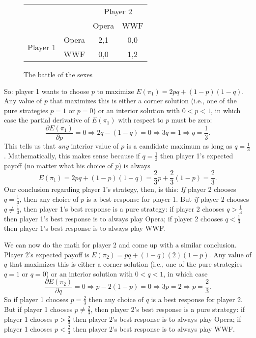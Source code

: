 \begin{figure}[b]
\begin{center}
\begin{tabular}{crcc}
& & \multicolumn{2}{c}{Player 2} \\ [.15cm]
& & Opera & WWF \\ \cline{3-4}
\multirow{2}{1.5cm}{Player 1} & Opera & \multicolumn{1}{|c|}{2,1} & \multicolumn{1}{c|}{0,0} \\ \cline{3-4}
                   & WWF & \multicolumn{1}{|c|}{0,0} & \multicolumn{1}{c|}{1,2} \\ \cline{3-4}
\end{tabular}
\end{center}
\caption{The battle of the sexes}
\label{game_battleofsexes2} %
\end{figure}

So: player 1 wants to choose $p$ to maximize $E(\pi_1)=2pq+(1-p)(1-q).$ Any value of $p$ that maximizes this is either a corner solution (i.e., one of the pure strategies $p=1$ or $p=0$) or an interior solution with $0<p<1$, in which case the partial derivative of $E(\pi_1)$ with respect to $p$ must be zero:
\[
\frac{\partial E(\pi_1)}{\partial p} = 0\Longrightarrow
2q-(1-q)=0\Longrightarrow 3q=1\Longrightarrow q=\frac{1}{3}.
\]
%
This tells us that \emph{any} interior value of $p$ is a candidate maximum as long as $q=\frac{1}{3}$. Mathematically, this makes sense because if $q=\frac{1}{3}$ then player 1's expected payoff (no matter what his choice of $p$) is always
\[
E(\pi_1)=2pq+(1-p)(1-q)=\frac{2}{3}p+\frac{2}{3}(1-p)=\frac{2}{3}.
\]
Our conclusion regarding player 1's strategy, then, is this: \emph{If} player 2 chooses $q=\frac{1}{3}$, then any choice of $p$ is a best response for player 1. But \emph{if} player 2 chooses $q\neq\frac{1}{3}$, then player 1's best response is a pure strategy: if player 2 chooses $q>\frac{1}{3}$ then player 1's best response is to always play Opera; if player 2 chooses $q<\frac{1}{3}$ then player 1's best response is to always play WWF.

We can now do the math for player 2 and come up with a similar conclusion. Player 2's expected payoff is $E(\pi_2)=pq+(1-q)(2)(1-p).$ Any value of $q$ that maximizes this is either a corner solution (i.e., one of the pure strategies $q=1$ or $q=0$) or an interior solution with $0<q<1$, in which case
\[
\frac{\partial E(\pi_2)}{\partial q} = 0\Longrightarrow
p-2(1-p)=0\Longrightarrow 3p=2\Longrightarrow p=\frac{2}{3}.
\]
%
So if player 1 chooses $p=\frac{2}{3}$ then any choice of $q$ is a best response for player 2. But if player 1 chooses $p\neq\frac{2}{3}$, then player 2's best response is a pure strategy: if player 1 chooses $p>\frac{2}{3}$ then player 2's best response is to always play Opera; if player 1 chooses $p<\frac{2}{3}$ then player 2's best response is to always play WWF.

